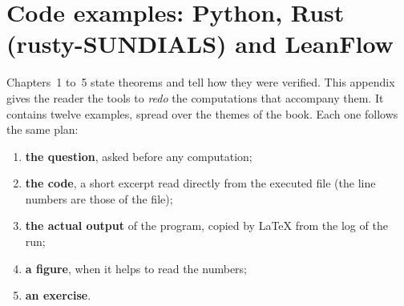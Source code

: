 \chapter{Code examples: Python, Rust (rusty-SUNDIALS) and LeanFlow}\label{appF:chap}

\newcommand{\appFsortie}[1]{\par\noindent\textbf{Actual output} (\texttt{\detokenize{#1}}):%
  }

Chapters~1 to~5 state theorems and tell how they were verified. This appendix gives the reader the tools to
\emph{redo} the computations that accompany them. It contains twelve examples, spread over the themes of the book.
Each one follows the same plan:
\begin{enumerate}
\item \textbf{the question}, asked before any computation;
\item \textbf{the code}, a short excerpt read directly from the executed file (the line numbers are those of the
file);
\item \textbf{the actual output} of the program, copied by \LaTeX{} from the log of the run;
\item \textbf{a figure}, when it helps to read the numbers;
\item \textbf{an exercise}.
\end{enumerate}

